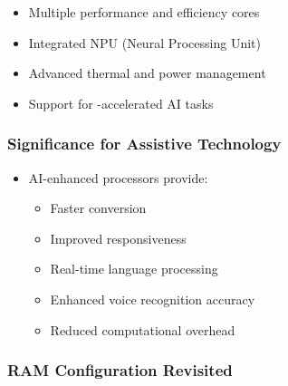 \begin{enumerate}
\begin{itemize}
		            \begin{itemize}
			            \item Multiple performance and efficiency cores \supercite{IntelHybridArchitecture}
			            \item Integrated NPU (Neural Processing Unit) \supercite{IntelNPU, AMDAIProcessing}
			            \item Advanced thermal and power management \supercite{IntelThermalManagement}
			            \item Support for -accelerated AI tasks \supercite{IntelAIAcceleration, AMDAIAcceleration}
		            \end{itemize}

	      \end{itemize}

\end{enumerate}


\subsubsection{Significance for Assistive Technology}

\begin{itemize}
	\item AI-enhanced processors provide:

	      \begin{itemize}
		      \item Faster  conversion \supercite{AIinAccessibility}
		      \item Improved  responsiveness \supercite{AIinAccessibility}
		      \item Real-time language processing \supercite{AIinAccessibility}
		      \item Enhanced voice recognition accuracy \supercite{AIinAccessibility}
		      \item Reduced computational overhead \supercite{AIinAccessibility}
	      \end{itemize}

\end{itemize}


\subsubsection{RAM Configuration Revisited}

